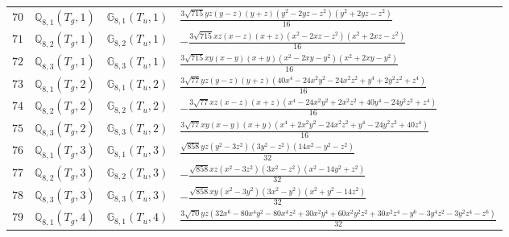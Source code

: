 \documentclass[fleqn,8pt,landscape]{jsarticle}
\begin{document}
\begin{table}[ht!]
\begin{center}
\begin{tabular}{cccl}
$ 70 $ & $ \mathbb{Q}_{8,1}(T_{g},1) $ & $ \mathbb{G}_{8,1}(T_{u},1) $ & $ \frac{3 \sqrt{715} y z \left(y - z\right) \left(y + z\right) \left(y^{2} - 2 y z - z^{2}\right) \left(y^{2} + 2 y z - z^{2}\right)}{16} $ \\
$ 71 $ & $ \mathbb{Q}_{8,2}(T_{g},1) $ & $ \mathbb{G}_{8,2}(T_{u},1) $ & $ - \frac{3 \sqrt{715} x z \left(x - z\right) \left(x + z\right) \left(x^{2} - 2 x z - z^{2}\right) \left(x^{2} + 2 x z - z^{2}\right)}{16} $ \\
$ 72 $ & $ \mathbb{Q}_{8,3}(T_{g},1) $ & $ \mathbb{G}_{8,3}(T_{u},1) $ & $ \frac{3 \sqrt{715} x y \left(x - y\right) \left(x + y\right) \left(x^{2} - 2 x y - y^{2}\right) \left(x^{2} + 2 x y - y^{2}\right)}{16} $ \\
$ 73 $ & $ \mathbb{Q}_{8,1}(T_{g},2) $ & $ \mathbb{G}_{8,1}(T_{u},2) $ & $ \frac{3 \sqrt{77} y z \left(y - z\right) \left(y + z\right) \left(40 x^{4} - 24 x^{2} y^{2} - 24 x^{2} z^{2} + y^{4} + 2 y^{2} z^{2} + z^{4}\right)}{16} $ \\
$ 74 $ & $ \mathbb{Q}_{8,2}(T_{g},2) $ & $ \mathbb{G}_{8,2}(T_{u},2) $ & $ - \frac{3 \sqrt{77} x z \left(x - z\right) \left(x + z\right) \left(x^{4} - 24 x^{2} y^{2} + 2 x^{2} z^{2} + 40 y^{4} - 24 y^{2} z^{2} + z^{4}\right)}{16} $ \\
$ 75 $ & $ \mathbb{Q}_{8,3}(T_{g},2) $ & $ \mathbb{G}_{8,3}(T_{u},2) $ & $ \frac{3 \sqrt{77} x y \left(x - y\right) \left(x + y\right) \left(x^{4} + 2 x^{2} y^{2} - 24 x^{2} z^{2} + y^{4} - 24 y^{2} z^{2} + 40 z^{4}\right)}{16} $ \\
$ 76 $ & $ \mathbb{Q}_{8,1}(T_{g},3) $ & $ \mathbb{G}_{8,1}(T_{u},3) $ & $ \frac{\sqrt{858} y z \left(y^{2} - 3 z^{2}\right) \left(3 y^{2} - z^{2}\right) \left(14 x^{2} - y^{2} - z^{2}\right)}{32} $ \\
$ 77 $ & $ \mathbb{Q}_{8,2}(T_{g},3) $ & $ \mathbb{G}_{8,2}(T_{u},3) $ & $ - \frac{\sqrt{858} x z \left(x^{2} - 3 z^{2}\right) \left(3 x^{2} - z^{2}\right) \left(x^{2} - 14 y^{2} + z^{2}\right)}{32} $ \\
$ 78 $ & $ \mathbb{Q}_{8,3}(T_{g},3) $ & $ \mathbb{G}_{8,3}(T_{u},3) $ & $ - \frac{\sqrt{858} x y \left(x^{2} - 3 y^{2}\right) \left(3 x^{2} - y^{2}\right) \left(x^{2} + y^{2} - 14 z^{2}\right)}{32} $ \\
$ 79 $ & $ \mathbb{Q}_{8,1}(T_{g},4) $ & $ \mathbb{G}_{8,1}(T_{u},4) $ & $ \frac{3 \sqrt{70} y z \left(32 x^{6} - 80 x^{4} y^{2} - 80 x^{4} z^{2} + 30 x^{2} y^{4} + 60 x^{2} y^{2} z^{2} + 30 x^{2} z^{4} - y^{6} - 3 y^{4} z^{2} - 3 y^{2} z^{4} - z^{6}\right)}{32} $ \\

\end{tabular}
\end{center}
\end{table}
\end{document}
